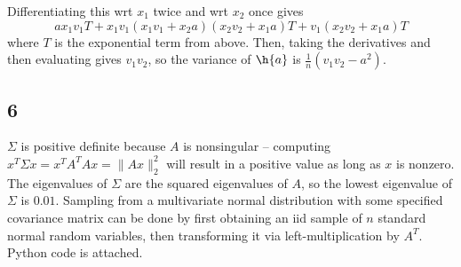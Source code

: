 \documentclass{article}
\begin{document}
Differentiating this wrt $x_1$ twice and wrt $x_2$ once gives 
\[ax_1v_1T+x_1v_1(x_1v_1+x_2a)(x_2v_2+x_1a)T+v_1(x_2v_2+x_1a)T\]
where $T$ is the exponential term from above. Then, taking the derivatives and then evaluating gives $v_1v_2$, so the variance of $\h{a}$ is $\frac{1}{n}(v_1v_2-a^2)$.
\subsection*{6}
$\Sigma$ is positive definite because $A$ is nonsingular -- computing $x^T\Sigma x=x^TA^TAx=\|Ax\|_2^2$ will result in a positive value as long as $x$ is nonzero. The eigenvalues of $\Sigma$ are the squared eigenvalues of $A$, so the lowest eigenvalue of $\Sigma$ is $0.01$.
Sampling from a multivariate normal distribution with some specified covariance matrix can be done by first obtaining an iid sample of $n$ standard normal random variables, then transforming it via left-multiplication by $A^T$. Python code is attached.
\end{document}
